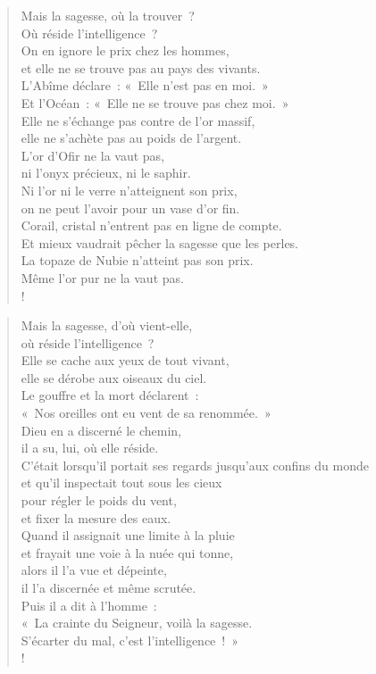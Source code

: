 \documentclass[french,twoside]{book} %
\def\mednobreak{\ifdim\lastskip<\medskipamount
  \removelastskip\nopagebreak\medskip\fi}
\newcommand{\labelblock}[1]{\medbreak{\noindent\color{rubric}\bfseries #1}\par\mednobreak}
\newcommand\chapterclose{} %
\begin{document}
\begin{verse}
Mais la sagesse, où la trouver ? \\
Où réside l’intelligence ?\\
On en ignore le prix chez les hommes, \\
et elle ne se trouve pas au pays des vivants.\\
L’Abîme déclare : « Elle n’est pas en moi. » \\
Et l’Océan : « Elle ne se trouve pas chez moi. »\\
Elle ne s’échange pas contre de l’or massif, \\
elle ne s’achète pas au poids de l’argent.\\
L’or d’Ofir ne la vaut pas, \\
ni l’onyx précieux, ni le saphir.\\
Ni l’or ni le verre n’atteignent son prix, \\
on ne peut l’avoir pour un vase d’or fin.\\
Corail, cristal n’entrent pas en ligne de compte. \\
Et mieux vaudrait pêcher la sagesse que les perles.\\
La topaze de Nubie n’atteint pas son prix. \\
Même l’or pur ne la vaut pas.\\!
\end{verse}

\labelblock{Accessible au Créateur}


\begin{verse}
Mais la sagesse, d’où vient-elle, \\
où réside l’intelligence ?\\
Elle se cache aux yeux de tout vivant, \\
elle se dérobe aux oiseaux du ciel.\\
Le gouffre et la mort déclarent : \\
« Nos oreilles ont eu vent de sa renommée. »\\
Dieu en a discerné le chemin, \\
il a su, lui, où elle réside.\\
C’était lorsqu’il portait ses regards jusqu’aux confins du monde \\
et qu’il inspectait tout sous les cieux\\
pour régler le poids du vent, \\
et fixer la mesure des eaux.\\
Quand il assignait une limite à la pluie \\
et frayait une voie à la nuée qui tonne,\\
alors il l’a vue et dépeinte, \\
il l’a discernée et même scrutée.\\
Puis il a dit à l’homme : \\
« La crainte du Seigneur, voilà la sagesse. \\
S’écarter du mal, c’est l’intelligence ! »\\!
\end{verse}
\chapterclose
\end{document}
